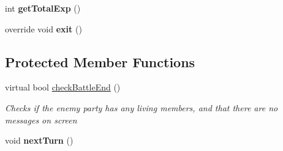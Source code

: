 \begin{DoxyCompactItemize}
\item 
\hypertarget{class_simple_r_p_g_1_1_states_1_1_battle_state_a90dd9cf46e142b4136b8b7e8707228bf}{int {\bfseries get\-Total\-Exp} ()}\label{class_simple_r_p_g_1_1_states_1_1_battle_state_a90dd9cf46e142b4136b8b7e8707228bf}

\item 
\hypertarget{class_simple_r_p_g_1_1_states_1_1_battle_state_a37be2a882cc9772ddcf91f11ece6a83a}{override void {\bfseries exit} ()}\label{class_simple_r_p_g_1_1_states_1_1_battle_state_a37be2a882cc9772ddcf91f11ece6a83a}

\end{DoxyCompactItemize}
\subsection*{Protected Member Functions}
\begin{DoxyCompactItemize}
\item 
virtual bool \hyperlink{class_simple_r_p_g_1_1_states_1_1_battle_state_a5075306cb94df8b52bfabf2bb4971dba}{check\-Battle\-End} ()
\begin{DoxyCompactList}\small\item\em Checks if the enemy party has any living members, and that there are no messages on screen \end{DoxyCompactList}\item 
\hypertarget{class_simple_r_p_g_1_1_states_1_1_battle_state_a66068004749422203c514634de5c95a6}{void {\bfseries next\-Turn} ()}\label{class_simple_r_p_g_1_1_states_1_1_battle_state_a66068004749422203c514634de5c95a6}

\end{DoxyCompactItemize}

